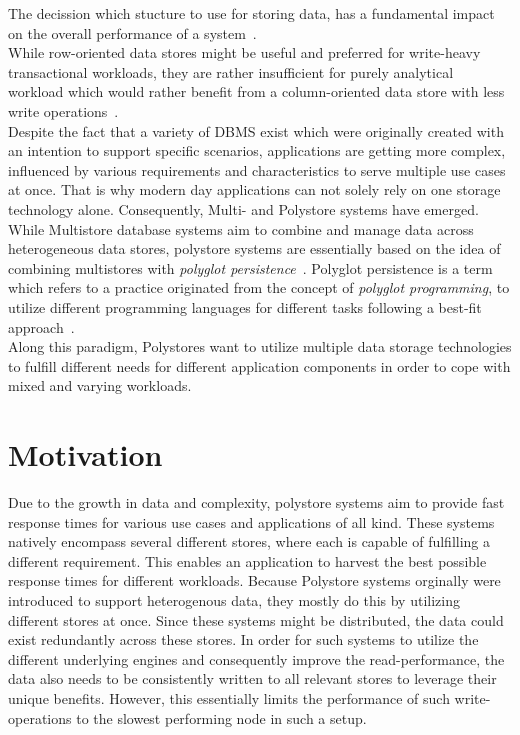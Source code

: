 The decission which stucture to use for storing data, has a fundamental impact on the overall performance of a system~\cite{plattner2015}.\\
While row-oriented data stores might be useful and preferred for write-heavy transactional 
workloads, they are rather insufficient for purely analytical workload which would rather benefit from a
column-oriented data store with less write operations~\cite{sigmond2008}.\\
Despite the fact that a variety of DBMS exist which were originally created with an intention to support specific scenarios,
applications are getting more complex, influenced by various requirements and characteristics to serve multiple use cases at once.
That is why modern day applications can not solely rely on one storage technology alone. 
Consequently, Multi- and Polystore systems have emerged. \\
While Multistore database systems aim to combine and manage data across heterogeneous data stores,
polystore systems are essentially based on the idea of combining multistores with
\textit{polyglot persistence}~\cite{polypheny2020}.
Polyglot persistence is a term which refers to a practice originated from the concept 
of \textit{polyglot programming}, to utilize different 
programming languages for different tasks following a best-fit approach~\cite{fowler2011}. \\
Along this paradigm, Polystores want to utilize multiple data storage technologies to
fulfill different needs for different application components in order to cope
with mixed and varying workloads.


\section{Motivation}

Due to the growth in data and complexity, polystore systems aim to provide fast response times for various use cases and applications of all kind.
These systems natively encompass several different stores, where each is capable of fulfilling a different requirement. 
This enables an application to harvest the best possible response times for different workloads.
Because Polystore systems orginally were introduced to support heterogenous data, they mostly do this by utilizing different stores at once.
Since these systems might be distributed, the data could exist redundantly across these stores. 
In order for such systems to utilize the different underlying engines and consequently improve the read-performance, 
the data also needs to be consistently written to all relevant stores to leverage their unique benefits.
However, this essentially limits the performance of such write-operations to the slowest performing node in such a setup.

